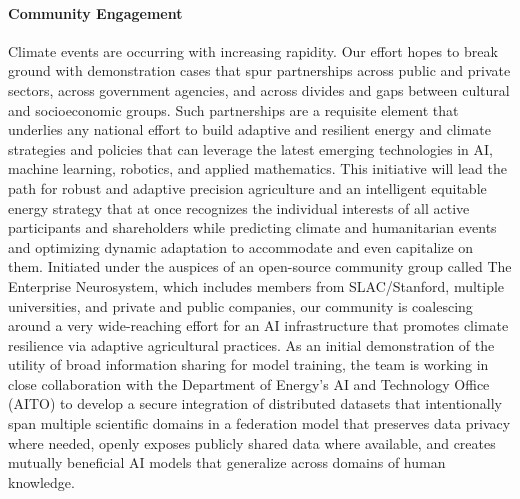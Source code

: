 \paragraph{Community Engagement}
Climate events are occurring with increasing rapidity. 
Our effort hopes to break ground with demonstration cases that spur partnerships across public and private sectors, across government agencies, and across divides and gaps between cultural and socioeconomic groups. 
Such partnerships are a requisite element \cite{SDGs} that underlies any national effort to build adaptive and resilient energy and climate strategies and policies that can leverage the latest emerging technologies in AI, machine learning, robotics, and applied mathematics. 
This initiative will lead the path for robust and adaptive precision agriculture and an intelligent equitable energy strategy that at once recognizes the individual interests of all active participants and shareholders while predicting climate and humanitarian events and optimizing dynamic adaptation to accommodate and even capitalize on them.
Initiated under the auspices of an open-source community group called The Enterprise Neurosystem, which includes members from SLAC/Stanford, multiple universities, and private and public companies, our community is coalescing around a very wide-reaching effort for an AI infrastructure that promotes climate resilience via adaptive agricultural practices.
As an initial demonstration of the utility of broad information sharing for model training, the team is working in close collaboration with the Department of Energy's AI and Technology Office (AITO) to develop a secure integration of distributed datasets that intentionally span multiple scientific domains in a federation model that preserves data privacy where needed, openly exposes publicly shared data where available, and creates mutually beneficial AI models that generalize across domains of human knowledge.

